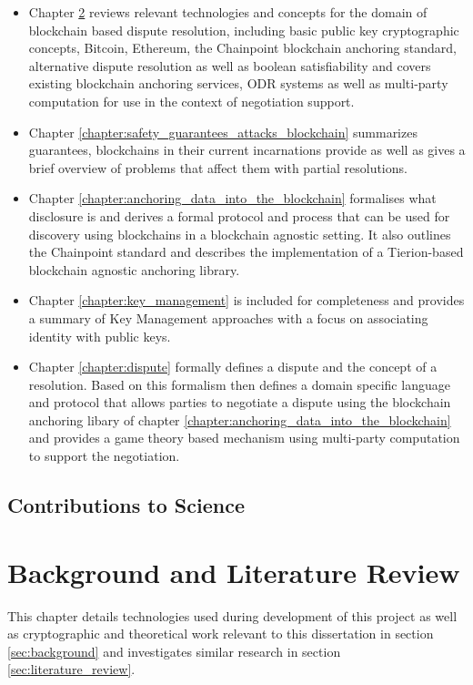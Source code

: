 \documentclass[12pt,msc,a4paper,oneside]{ucl_thesis}
\begin{document}
\begin{itemize}
    \item Chapter \ref{chapter:background_and_literature} reviews relevant technologies and concepts for the domain of blockchain based dispute resolution, including basic public key cryptographic concepts, Bitcoin, Ethereum, the Chainpoint blockchain anchoring standard, alternative dispute resolution as well as boolean satisfiability and covers existing blockchain anchoring services, ODR systems as well as multi-party computation for use in the context of negotiation support.

    \item Chapter \ref{chapter:safety_guarantees_attacks_blockchain} summarizes guarantees, blockchains in their current incarnations provide as well as gives a brief overview of problems that affect them with partial resolutions.

    \item Chapter \ref{chapter:anchoring_data_into_the_blockchain} formalises what disclosure is and derives a formal protocol and process that can be used for discovery using blockchains in a blockchain agnostic setting. It also outlines the Chainpoint standard and describes the implementation of a Tierion-based blockchain agnostic anchoring library.

    \item Chapter \ref{chapter:key_management} is included for completeness and provides a summary of Key Management approaches with a focus on associating identity with public keys.

    \item Chapter \ref{chapter:dispute} formally defines a dispute and the concept of a resolution. Based on this formalism then defines a domain specific language and protocol that allows parties to negotiate a dispute using the blockchain anchoring libary of chapter \ref{chapter:anchoring_data_into_the_blockchain} and provides a game theory based mechanism using multi-party computation to support the negotiation.
\end{itemize}


\section{Contributions to Science}


\chapter{Background and Literature Review}
\label{chapter:background_and_literature}
This chapter details technologies used during development of this project as well as cryptographic and theoretical work relevant to this dissertation in section \ref{sec:background} and investigates similar research in section \ref{sec:literature_review}.
\end{document}
